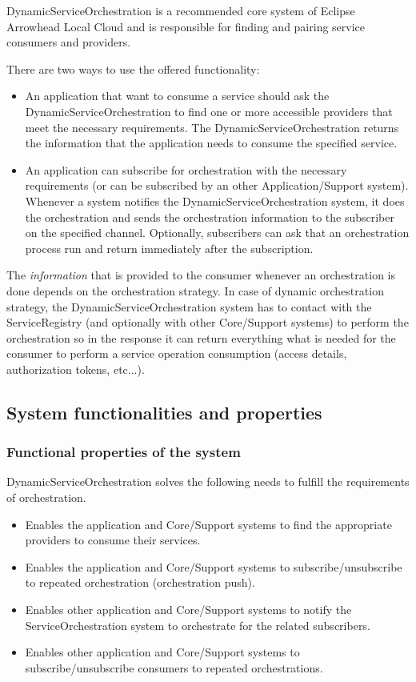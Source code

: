 \documentclass[a4paper]{arrowhead}
\begin{document}
DynamicServiceOrchestration is a recommended core system of Eclipse Arrowhead Local Cloud and is responsible for finding and pairing service consumers and providers. 

There are two ways to use the offered functionality:

\begin{itemize}
    \item An application that want to consume a service should ask the DynamicServiceOrchestration to find one or more accessible providers that meet the necessary requirements. The DynamicServiceOrchestration returns the information that the application needs to consume the specified service.
    \item An application can subscribe for orchestration with the necessary requirements (or can be subscribed by an other Application/Support system). Whenever a system notifies the DynamicServiceOrchestration system, it does the orchestration and sends the orchestration information to the subscriber on the specified channel. Optionally, subscribers can ask that an orchestration process run and return immediately after the subscription.
\end{itemize}

The \textit{information} that is provided to the consumer whenever an orchestration is done depends on the orchestration strategy. In case of dynamic orchestration strategy, the DynamicServiceOrchestration system has to contact with the ServiceRegistry (and optionally with other Core/Support systems) to perform the orchestration so in the response it can return everything what is needed for the consumer to perform a service operation consumption (access details, authorization tokens, etc...).

\subsection{System functionalities and properties}
\label{sec:properties}

\subsubsection {Functional properties of the system}
DynamicServiceOrchestration solves the following needs to fulfill the requirements of orchestration.

\begin{itemize}
    \item Enables the application and Core/Support systems to find the appropriate providers to consume their services.
    \item Enables the application and Core/Support systems to subscribe/unsubscribe to repeated orchestration (orchestration push).
    \item Enables other application and Core/Support systems to notify the ServiceOrchestration system to orchestrate for the related subscribers.
    \item Enables other application and Core/Support systems to subscribe/unsubscribe consumers to repeated orchestrations.
\end{itemize}
\end{document}
